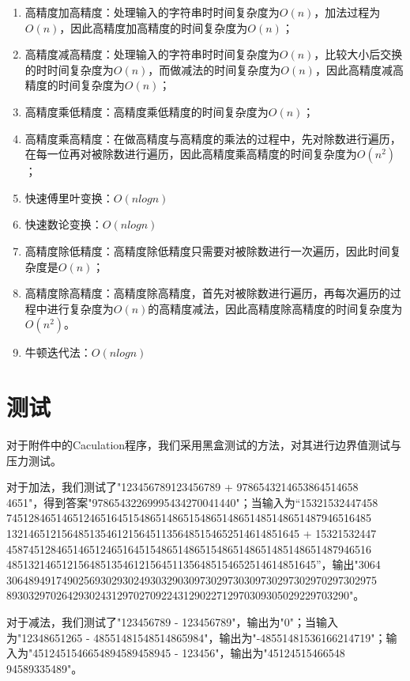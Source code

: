 \documentclass{article}
\begin{document}
\begin{enumerate}
    \item 高精度加高精度：处理输入的字符串时时间复杂度为$O(n)$，加法过程为$O(n)$，因此高精度加高精度的时间复杂度为$O(n)$；
    \item 高精度减高精度：处理输入的字符串时时间复杂度为$O(n)$，比较大小后交换的时时间复杂度为$O(n)$，而做减法的时间复杂度为$O(n)$，因此高精度减高精度的时间复杂度为$O(n)$；
    \item 高精度乘低精度：高精度乘低精度的时间复杂度为$O(n)$；
    \item 高精度乘高精度：在做高精度与高精度的乘法的过程中，先对除数进行遍历，在每一位再对被除数进行遍历，因此高精度乘高精度的时间复杂度为$O(n^2)$；
    \item 快速傅里叶变换：$O(nlogn)$
    \item 快速数论变换：$O(nlogn)$
    \item 高精度除低精度：高精度除低精度只需要对被除数进行一次遍历，因此时间复杂度是$O(n)$；
    \item 高精度除高精度：高精度除高精度，首先对被除数进行遍历，再每次遍历的过程中进行复杂度为$O(n)$的高精度减法，因此高精度除高精度的时间复杂度为$O(n^2)$。
    \item 牛顿迭代法：$O(nlogn)$
\end{enumerate}

\section{测试}

对于附件中的Caculation程序，我们采用黑盒测试的方法，对其进行边界值测试与压力测试。

对于加法，我们测试了"123456789123456789 + 9786543214653864514658\\
4651"，得到答案"97865432269995434270041440"；当输入为“15321532447458\\745128465146512465164515486514865154865148651485148651487946516485\\13214651215648513546121564511356485154652514614851645 + 15321532447\\458745128465146512465164515486514865154865148651485148651487946516\\48513214651215648513546121564511356485154652514614851645”，输出"3064\\3064894917490256930293024930329030973029730309730297302970297302975\\89303297026429302431297027092243129022712970309305029229703290"。

对于减法，我们测试了"123456789 - 123456789"，输出为"0"；当输入为"12348651265 - 48551481548514865984"，输出为"-48551481536166214719"；输入为"4512451546654894589458945 - 123456"，输出为"45124515466548\\94589335489"。
\end{document}
